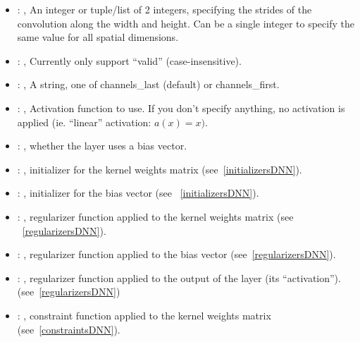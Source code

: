 \begin{itemize}
\begin{itemize}
        \item {}: , 
          An integer or tuple/list of 2 integers, specifying the strides of the convolution along
          the width and         height. Can be a single integer to specify the same value for all
          spatial dimensions.

        \item {}: , 
          Currently only support ``valid'' (case-insensitive).

        \item {}: , 
          A string, one of channels\_last (default) or channels\_first.

        \item {}: , 
          Activation function to use. If you don't specify anything, no activation is applied (ie.
          ``linear''         activation: $a(x) = x)$.

        \item {}: , 
          whether the layer uses a bias vector.

        \item {}: , 
          initializer for the kernel weights matrix (see~\ref{initializersDNN}).

        \item {}: , 
          initializer for the bias vector (see ~\ref{initializersDNN}).

        \item {}: , 
          regularizer function applied to the kernel weights matrix (see ~\ref{regularizersDNN}).

        \item {}: , 
          regularizer function applied to the bias vector (see~\ref{regularizersDNN}).

        \item {}: , 
          regularizer function applied to the output         of the layer (its ``activation'').
          (see~\ref{regularizersDNN})

        \item {}: , 
          constraint function applied to the kernel weights matrix (see~\ref{constraintsDNN}).


\end{itemize}
\end{itemize}
